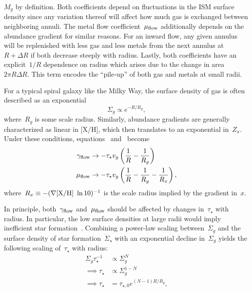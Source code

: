 $M_g$ by definition.
Both coefficients depend on fluctuations in the ISM surface density since any
variation thereof will affect how much gas is exchanged between neighboring
annuli.
The metal flow coefficient~$\mu_{\text{flow}}$ additionally depends on the abundance
gradient for similar reasons.
For an inward flow, any given annulus will be replenished with less gas and
less metals from the next annulus at~$R + \Delta R$ if both decrease steeply
with radius.
Lastly, both coefficients have an explicit~$1 / R$ dependence on radius which
arises due to the change in area~$2 \pi R \Delta R$.
This term encodes the ``pile-up'' of both gas and metals at small radii.
\par
For a typical spiral galaxy like the Milky Way, the surface density of gas is
often described as an exponential
\begin{equation}
\Sigma_g \propto e^{-R / R_g},
\end{equation}
where~$R_g$ is some scale radius.
Similarly, abundance gradients are generally characterized as linear in [X/H],
which then translates to an exponential in~$Z_x$.
Under these conditions, equations~
and~ become
\begin{subequations}\begin{align}
\gamma_{\text{flow}} &\rightarrow -\tau_\star v_g
\left(\frac{1}{R} - \frac{1}{R_g}\right)
\label{outflows:eq:gamma-flow}
\\
\mu_{\text{flow}} &\rightarrow -\tau_\star v_g
\left(\frac{1}{R} - \frac{1}{R_g} - \frac{1}{R_x}\right),
\label{outflows:eq:mu-flow}
\end{align}\end{subequations}
where~$R_x \equiv -(\nabla\text{[X/H]}~\ln 10)^{-1}$ is the scale radius implied by the
gradient in~$x$.
\par
In principle, both~$\gamma_{\text{flow}}$ and~$\mu_{\text{flow}}$ should be affected by changes
in~$\tau_\star$ with radius.
In particular, the low surface densities at large radii would imply inefficient
star formation~\citep[i.e., higher~$\tau_\star$; e.g.,][]{delosReyes2019,
Kennicutt2021}.
Combining a power-law scaling between~$\Sigma_g$ and the surface density of
star formation~$\dot{\Sigma}_\star$ with an exponential decline in~$\Sigma_g$
yields the following scaling of~$\tau_\star$ with radius:
\begin{equation}\begin{split}
\Sigma_g \tau_\star^{-1} &\propto \Sigma_g^N
\\
\implies \tau_\star &\propto \Sigma_g^{1 - N}
\\
\implies \tau_\star &= \tau_{\star,0} e^{(N - 1) R / R_g},
\end{split}\end{equation}
